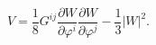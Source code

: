 \begin{equation}
V = \frac{1}{8} G^{ij} 
\frac{\partial W}{\partial \varphi^i} 
\frac{\partial W}{\partial \varphi^j} 
- \frac{1}{3} \left|W \right|^2.\label{I9}
\end{equation}

